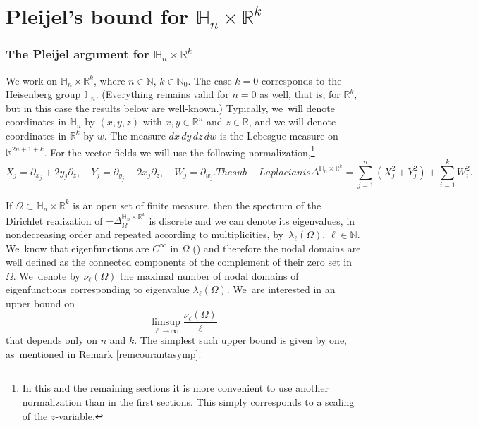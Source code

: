 \documentclass[10pt]{amsart}
\theoremstyle{definition}
\newcommand{\1}{\mathbbm{1}}
\newcommand{\N}{\mathbb{N}}
\newcommand{\R}{\mathbb{R}}
\begin{document}
\part{Pleijel's bound for \texorpdfstring{$\mathbb H_n\times\R^k$}{HnRk}}\label{part2}

\section{The Pleijel argument for \texorpdfstring{$\mathbb H_n\times\R^k$}{HnRk} }\label{sec:mainhnrk}

We work on $\mathbb H_n\times\R^k$, where $n\in\N$, $k\in\N_0$. The case $k=0$ corresponds to the Heisenberg group $\mathbb H_n$. (Everything remains valid for $n=0$ as well, that is, for $\R^k$, but in this case the results below are well-known.) Typically, we~will denote coordinates in $\mathbb H_n$ by $(x,y,z)$ with $x,y\in\R^n$ and $z\in\R$, and we will denote coordinates in $\R^k$ by $w$. The measure $dx\,dy\,dz\,dw$ is the Lebesgue measure on $\R^{2n+1+k}$. For the vector fields we will use the following normalization,\footnote{In this and the remaining sections it is more convenient to use another normalization than in the first sections. This simply corresponds to a scaling of the $z$-variable.}
\begin{subequations}\label{Otherformulation}
\begin{equation}
X_j = \partial_{x_j} + 2y_j \partial_z,\quad
Y_j = \partial_{y_j} - 2x_j \partial_z,\quad
W_j = \partial_{w_j}.
\end{equation}
The sub-Laplacian is
\begin{equation}
\Delta^{\mathbb H_n\times\R^k} = \sum_{j=1}^n (X_j^2 + Y_j^2) + \sum_{i=1}^k W_i^2.
\end{equation}
\end{subequations}

If $\Omega\subset\mathbb H_n\times\R^k$ is an open set of finite measure, then the spectrum of the Dirichlet realization of $ -\Delta^{\mathbb H_n\times\R^k}_\Omega $ is discrete and we can denote its eigenvalues, in nondecreasing order and repeated according to multiplicities, by~$\lambda_\ell(\Omega)$, $\ell\in\N$. We~know that eigenfunctions are $C^\infty$ in $\Omega$ (\cite{Ho}) and therefore the nodal domains are well defined as the connected components of the complement of their zero set in $\Omega$. We~denote by $\nu_\ell(\Omega)$ the maximal number of nodal domains of eigenfunctions corresponding to eigenvalue $\lambda_\ell(\Omega)$. We~are interested in an upper bound on
\[
\limsup_{\ell\to\infty} \frac{\nu_\ell(\Omega)}{\ell}
\]
that depends only on $n$ and $k$. The simplest such upper bound is given by one, as~mentioned in Remark \ref{remcourantasymp}.
\end{document}
